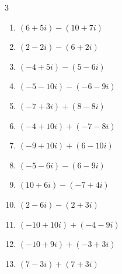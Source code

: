 \begin{multicols}{3}
\begin{enumerate}
        \phantom{$\displaystyle =8-16i$}

  \item $\displaystyle (6+5i) - (10+7i)$

        \phantom{$\displaystyle =-4-2i$}

  \item $\displaystyle (2-2i) - (6+2i)$

        \phantom{$\displaystyle =-4-4i$}

  \item $\displaystyle (-4+5i) - (5-6i)$

        \phantom{$\displaystyle =-9+11i$}

  \item $\displaystyle (-5-10i) - (-6-9i)$

        \phantom{$\displaystyle =1-i$}

  \item $\displaystyle (-7+3i) + (8-8i)$

        \phantom{$\displaystyle =1-5i$}

  \item $\displaystyle (-4+10i) + (-7-8i)$

        \phantom{$\displaystyle =-11+2i$}

  \item $\displaystyle (-9+10i) + (6-10i)$

        \phantom{$\displaystyle =-3$}

  \item $\displaystyle (-5-6i) - (6-9i)$

        \phantom{$\displaystyle =-11+3i$}

  \item $\displaystyle (10+6i) - (-7+4i)$

        \phantom{$\displaystyle =17+2i$}

  \item $\displaystyle (2-6i) - (2+3i)$

        \phantom{$\displaystyle =-9i$}

  \item $\displaystyle (-10+10i) + (-4-9i)$

        \phantom{$\displaystyle =-14+i$}

  \item $\displaystyle (-10+9i) + (-3+3i)$

        \phantom{$\displaystyle =-13+12i$}

  \item $\displaystyle (7-3i) + (7+3i)$


\end{enumerate}
\end{multicols}
